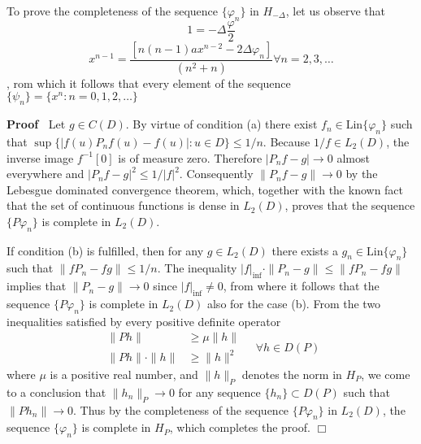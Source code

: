 \documentclass{article}
\newenvironment{proof}{\noindent\textbf{Proof\ }}{\hspace*{\fill}$\Box$\medskip}
\begin{document}
To prove the completeness of the sequence $\{\varphi_n \}$ in $H_{- \Delta}$,
let us observe that
\begin{equation}
  1 = - \Delta \frac{\varphi}{2}
\end{equation}
\begin{equation}
  x^{n - 1} = \frac{[n (n - 1) ax^{n - 2} - 2 \Delta \varphi_n]}{(n^2 + n)}
  \forall n = 2, 3, \ldots
\end{equation}
, rom which it follows that every element of the sequence $\{\psi_n \} = \{x^n
: n = 0, 1, 2, \ldots\}$

\begin{proof}
  Let $g \in C (D)$. By virtue of condition (a) there exist $f_n \in
  \text{Lin} \{\varphi_n \}$ such that $\sup \{|f (u) P_n f (u) - f (u) | : u
  \in D\} \leq 1 / n$. Because $1 / f \in L_2 (D)$, the inverse image $f^{- 1}
  [0]$ is of measure zero. Therefore $|P_n f - g| \rightarrow 0$ almost
  everywhere and $|P_n f - g|^2 \leq 1 / |f|^2$. Consequently $\|P_n f - g\|
  \rightarrow 0$ by the Lebesgue dominated convergence theorem, which,
  together with the known fact that the set of continuous functions is dense
  in $L_2 (D)$, proves that the sequence $\{P \varphi_n \}$ is complete in
  $L_2 (D)$.
  
  {\noindent}If condition (b) is fulfilled, then for any $g \in L_2 (D)$ there
  exists a $g_n \in \text{Lin} \{\varphi_n \}$ such that $\|fP_n - fg\| \leq 1
  / n$. The inequality $|f|_{\inf} \cdot \|P_n - g\| \leq \|fP_n - fg\|$
  implies that $\|P_n - g\| \rightarrow 0$ since $|f|_{\inf} \neq 0$, from
  where it follows that the sequence $\{P \varphi_n \}$ is complete in $L_2
  (D)$ also for the case (b). From the two inequalities satisfied by every
  positive definite operator
  \begin{equation}
    \ 
  \end{equation}
  \begin{equation}
    \begin{array}{rl}
      \|Ph\| & \geq \mu \|h\|\\
      \|Ph\| \cdot \|h\| & \geq \|h\|^2
    \end{array} \quad \forall h \in D (P)
  \end{equation}
  {\noindent}where $\mu$ is a positive real number, and $\|h\|_P$ denotes the
  norm in $H_P$, we come to a conclusion that $\|h_n \|_P \rightarrow 0$ for
  any sequence $\{h_n \} \subset D (P)$ such that $\|Ph_n \| \rightarrow 0$.
  Thus by the completeness of the sequence $\{P \varphi_n \}$ in $L_2 (D)$,
  the sequence $\{\varphi_n \}$ is complete in $H_P$, which completes the
  proof.
\end{proof}
\end{document}
